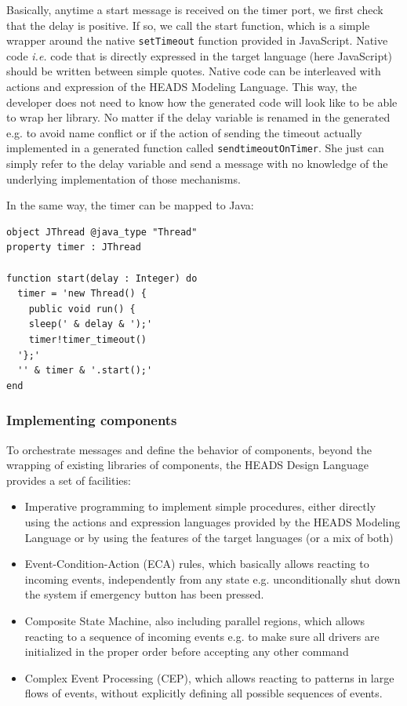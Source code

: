 Basically, anytime a start message is received on the timer port, we first check that the delay is positive. If so, we call the start function, which is a simple wrapper around the native \texttt{setTimeout} function provided in JavaScript. Native code {\em i.e.} code that is directly expressed in the target language (here JavaScript) should be written between simple quotes. Native code can be interleaved with actions and expression of the HEADS Modeling Language. This way, the developer does not need to know how the generated code will look like to be able to wrap her library. No matter if the delay variable is renamed in the generated e.g. to avoid name conflict or if the action of sending the timeout actually implemented in a generated function called \texttt{sendtimeoutOnTimer}. She just can simply refer to the delay variable and send a message with no knowledge of the underlying implementation of those mechanisms. 

In the same way, the timer can be mapped to Java:

\begin{lstlisting}
object JThread @java_type "Thread" 
property timer : JThread 

function start(delay : Integer) do  
  timer = 'new Thread() { 
    public void run() { 
    sleep(' & delay & ');' 
    timer!timer_timeout() 
  '};' 
  '' & timer & '.start();' 
end 
\end{lstlisting} 

\subsubsection{Implementing components}

To orchestrate messages and define the behavior of components, beyond the wrapping of existing libraries of components, the HEADS Design Language provides a set of facilities: 
\begin{itemize}
\item Imperative programming to implement simple procedures, either directly using the actions and expression languages provided by the HEADS Modeling Language or by using the features of the target languages (or a mix of both) 
\item Event-Condition-Action (ECA) rules, which basically allows reacting to incoming events, independently from any state e.g. unconditionally shut down the system if emergency button has been pressed.  
\item Composite State Machine, also including parallel regions, which allows reacting to a sequence of incoming events e.g. to make sure all drivers are initialized in the proper order before accepting any other command 
\item Complex Event Processing (CEP), which allows reacting to patterns in large flows of events, without explicitly defining all possible sequences of events.
	\end{itemize}

